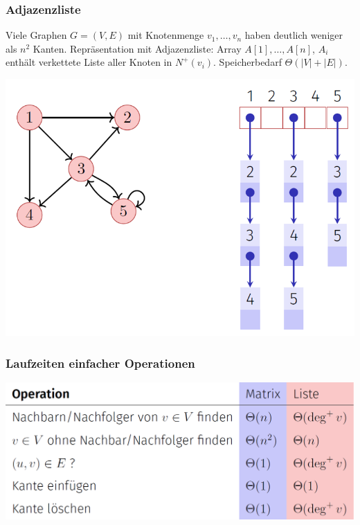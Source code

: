 \begin{sectionbox}
\subsubsection{Adjazenzliste}\par\smallskip
Viele Graphen $G=(V, E)$ mit Knotenmenge $v_{1}, \ldots, v_{n}$ haben deutlich weniger als $n^{2}$ Kanten. Repräsentation mit Adjazenzliste: Array $A[1], \ldots, A[n]$, $A_{i}$ enthält verkettete Liste aller Knoten in $N^{+}\left(v_{i}\right)$. Speicherbedarf $\Theta\left(|V|+|E|\right)$.\par\smallskip
\begin{center}
    \includegraphics[width = 0.9\columnwidth]{../img/AdjList.png}
\end{center}\vspace{10px}

\subsubsection{Laufzeiten einfacher Operationen}\par\smallskip
\begin{center}
    \includegraphics[width = \columnwidth]{../img/AdjLaufzeiten.png}
\end{center}\smallskip
\end{sectionbox}
